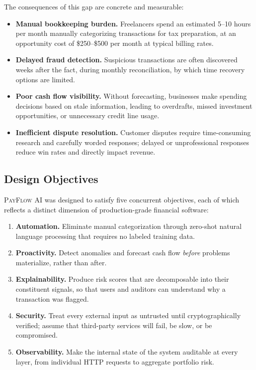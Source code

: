 \documentclass[11pt,a4paper]{article}
\newcommand{\payflow}{\textsc{PayFlow AI}}
\begin{document}
The consequences of this gap are concrete and measurable:

\begin{itemize}[leftmargin=*]
  \item \textbf{Manual bookkeeping burden.} Freelancers spend an estimated 5--10 hours per month manually categorizing transactions for tax preparation, at an opportunity cost of \$250--\$500 per month at typical billing rates.
  \item \textbf{Delayed fraud detection.} Suspicious transactions are often discovered weeks after the fact, during monthly reconciliation, by which time recovery options are limited.
  \item \textbf{Poor cash flow visibility.} Without forecasting, businesses make spending decisions based on stale information, leading to overdrafts, missed investment opportunities, or unnecessary credit line usage.
  \item \textbf{Inefficient dispute resolution.} Customer disputes require time-consuming research and carefully worded responses; delayed or unprofessional responses reduce win rates and directly impact revenue.
\end{itemize}

\subsection{Design Objectives}

\payflow{} was designed to satisfy five concurrent objectives, each of which reflects a distinct dimension of production-grade financial software:

\begin{enumerate}[leftmargin=*]
  \item \textbf{Automation.} Eliminate manual categorization through zero-shot natural language processing that requires no labeled training data.
  \item \textbf{Proactivity.} Detect anomalies and forecast cash flow \emph{before} problems materialize, rather than after.
  \item \textbf{Explainability.} Produce risk scores that are decomposable into their constituent signals, so that users and auditors can understand why a transaction was flagged.
  \item \textbf{Security.} Treat every external input as untrusted until cryptographically verified; assume that third-party services will fail, be slow, or be compromised.
  \item \textbf{Observability.} Make the internal state of the system auditable at every layer, from individual HTTP requests to aggregate portfolio risk.
\end{enumerate}
\end{document}
